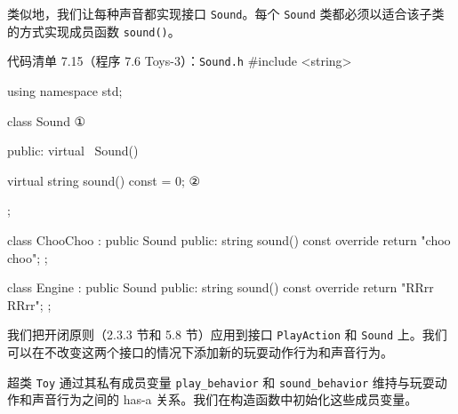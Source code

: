 类似地，我们让每种声音都实现接口 \texttt{Sound}。每个 \texttt{Sound} 类都必须以适合该子类的方式实现成员函数 \texttt{sound()}。

\begin{codeboxt}{代码清单 7.15（程序 7.6 Toys-3）：\texttt{Sound.h}}
#include <string>

using namespace std;

class Sound                           ①
{
public:
    virtual ~Sound() {}

    virtual string sound() const = 0; ②
};

class ChooChoo : public Sound
{
public:
    string sound() const override { return "choo choo"; }
};

class Engine : public Sound
{
public:
    string sound() const override { return "RRrr RRrr"; }
};
\end{codeboxt}
\par
{}\par

我们把开闭原则（2.3.3 节和 5.8 节）应用到接口 \texttt{Play\allowbreak{}Action} 和 \texttt{Sound} 上。我们可以在不改变这两个接口的情况下添加新的玩耍动作行为和声音行为。

超类 \texttt{Toy} 通过其私有成员变量 \texttt{play\_\allowbreak{}behavior} 和 \texttt{sound\_\allowbreak{}behavior} 维持与玩耍动作和声音行为之间的 has-a 关系。我们在构造函数中初始化这些成员变量。

